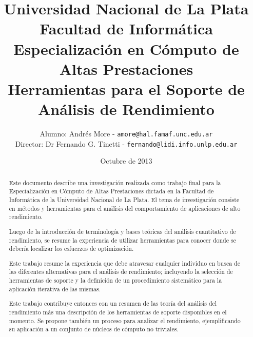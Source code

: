 \documentclass[a4paper]{report}
\begin{document}
\title{Universidad Nacional de La Plata\\Facultad de Inform\'atica\\ \bigskip
  Especializaci\'on en C\'omputo de Altas Prestaciones\\ \bigskip
  Herramientas para el Soporte de An\'alisis de Rendimiento}

\author{
  Alumno: Andr\'es More - {\tt amore@hal.famaf.unc.edu.ar}\\
  Director: Dr Fernando G. Tinetti - {\tt fernando@lidi.info.unlp.edu.ar}
}

\date{Octubre de 2013}

\maketitle

\begin{abstract}

  Este documento describe una investigaci\'on realizada como trabajo final para
  la Especializaci\'on en C\'omputo de Altas Prestaciones dictada en la
  Facultad de Inform\'atica de la Universidad Nacional de La Plata.
  El tema de investigaci\'on consiste en m\'etodos y herramientas para
  el an\'alisis del comportamiento de aplicaciones de alto rendimiento.

  \bigskip

  Luego de la introducci\'on de terminolog\'ia y bases te\'oricas del
  an\'alisis cuantitativo de rendimiento, se resume la experiencia de utilizar
  herramientas para conocer donde se deber\'ia localizar los esfuerzos de
  optimizaci\'on.

  \bigskip

  Este trabajo resume la experiencia que debe atravesar cualquier
  individuo en busca de las diferentes alternativas para el an\'alisis de
  rendimiento; incluyendo la selecci\'on de herramientas de soporte y la
  definici\'on de un procedimiento sistem\'atico para la aplicaci\'on iterativa
  de las mismas.

  \bigskip

  Este trabajo contribuye entonces con un resumen de las teor\'ia del an\'alisis del
  rendimiento m\'as una descripci\'on de los herramientas de soporte 
  disponibles en el momento. Se propone tambi\'en un proceso para analizar el
  rendimiento, ejemplificando su aplicaci\'on a un conjunto de n\'ucleos de
  c\'omputo no triviales.

\end{abstract}
\end{document}
